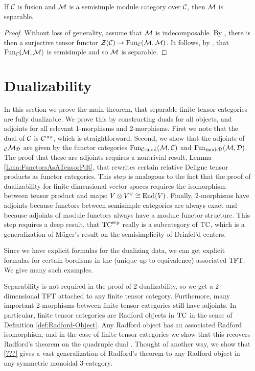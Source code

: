 \documentclass{amsart}
\begin{document}
\begin{theorem} \label{thm:SSModuleCatsAreSep}
If $\mathcal C$ is fusion and $\mathcal M$ is a semisimple module category over $\mathcal C$, then $\mathcal M$ is separable.
\end{theorem}
\begin{proof}
Without loss of generality, assume that $\mathcal M$ is indecomposable.  By \cite{???}, there is then a surjective tensor functor $\mathcal Z(\mathcal C) \rightarrow \operatorname{Fun}_\mathcal C(\mathcal M, \mathcal M)$.  It follows, by \cite{???}, that $\operatorname{Fun}_\mathcal C(\mathcal M, \mathcal M)$ is semisimple and so $\mathcal M$ is separable.
\end{proof}


\section{Dualizability} \label{sec:dualfusion}

In this section we prove the main theorem, that separable finite tensor categories are fully dualizable.  We prove this by constructing duals for all objects, and adjoints for all relevant $1$-morphisms and $2$-morphisms.  First we note that the dual of $\mathcal C$ is $\mathcal C^{\mathrm{mp}}$, which is straightforward.  Second, we show that the adjoints of ${}_\mathcal C \mathcal M_\mathcal D$ are given by the functor categories $\operatorname{Fun}_{{\mathcal C\text{-mod}}}(\mathcal M, \mathcal C)$ and $\operatorname{Fun}_{\text{mod-}\mathcal D}(\mathcal M, \mathcal D)$.  The proof that these are adjoints requires a nontrivial result, Lemma \ref{Lma:FunctorsAsATensorPdt}, that rewrites certain relative Deligne tensor products as functor categories.  This step is analogous to the fact that the proof of dualizability for finite-dimensional vector spaces requires the isomorphism between tensor product and maps: $V \otimes V^\vee \cong \operatorname{End}(V)$.  Finally, $2$-morphisms have adjoints because functors between semisimple categories are always exact and because adjoints of module functors always have a module functor structure.  This step requires a deep result, that ${\mathrm{TC}^{\text{sep}}}$ really is a subcategory of $\mathrm{TC}$, which is a generalization of M\"uger's result on the semisimplicity of Drinfel'd centers.

Since we have explicit formulas for the dualizing data, we can get explicit formulas for certain bordisms in the (unique up to equivalence) associated TFT.  We give many such examples.

Separability is not required in the proof of $2$-dualizability, so we get a $2$-dimensional TFT attached to any finite tensor category.  Furthemore, many important $2$-morphisms between finite tensor categories still have adjoints.  In particular, finite tensor categories are Radford objects in $\mathrm{TC}$ in the sense of Definition \ref{def:Radford-Object}.  Any Radford object has an associated Radford isomorphism, and in the case of finite tensor categories we show that this recovers Radford's theorem on the quadruple dual \cite{MR0407069, MR2097289}.  Thought of another way, we show that \ref{???} gives a vast generalization of Radford's theorem to any Radford object in any symmetric monoidal $3$-category.
\end{document}

